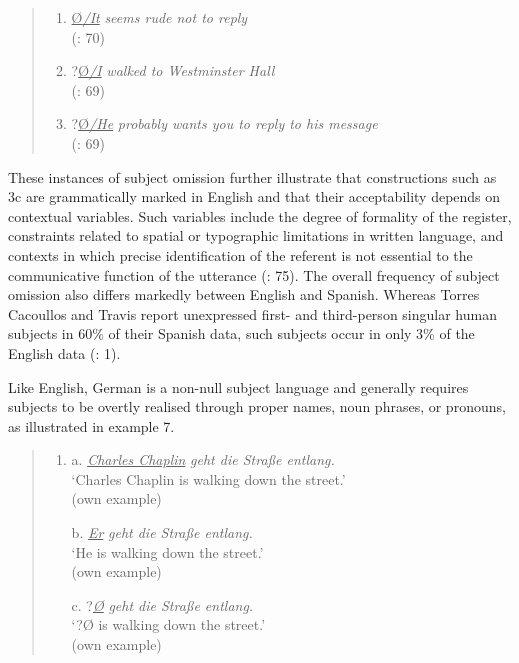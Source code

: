 \documentclass[
  letterpaper,
  DIV=11,
  numbers=noendperiod]{scrartcl}
\begin{document}
\begin{quote}
\begin{enumerate}
\def\labelenumi{(\arabic{enumi})}
\setcounter{enumi}{3}
\item
  \ul{Ø\emph{/It}} \emph{seems rude not to reply}\\
  (: 70)
\item
  ?\ul{Ø\emph{/I}} \emph{walked to Westminster Hall}\\
  (: 69)
\item
  ?\ul{Ø\emph{/He}} \emph{probably wants you to reply to his message}~\\
  (: 69)
\end{enumerate}
\end{quote}

\hfill\break
These instances of subject omission further illustrate that
constructions such as 3c are grammatically marked in English and that
their acceptability depends on contextual variables. Such variables
include the degree of formality of the register, constraints related to
spatial or typographic limitations in written language, and contexts in
which precise identification of the referent is not essential to the
communicative function of the utterance (: 75). The overall frequency of subject omission also differs
markedly between English and Spanish. Whereas Torres Cacoullos and
Travis report unexpressed first- and third-person singular human
subjects in 60\% of their Spanish data, such subjects occur in only 3\%
of the English data
(: 1).

Like English, German is a non-null subject language and generally
requires subjects to be overtly realised through proper names, noun
phrases, or pronouns, as illustrated in example 7.

\begin{quote}
\begin{enumerate}
\def\labelenumi{(\arabic{enumi})}
\setcounter{enumi}{6}
\item
  a. \ul{\emph{Charles Chaplin}} \emph{geht die Straße entlang.}\\
  `Charles Chaplin is walking down the street.'\\
  (own example)

  b. \ul{\emph{Er}} \emph{geht die Straße entlang.}\\
  `He is walking down the street.'\\
  (own example)

  c. ?\ul{\emph{Ø}} \emph{geht die Straße entlang.}\\
  `?Ø is walking down the street.'\\
  (own example)
\end{enumerate}
\end{quote}
\end{document}
